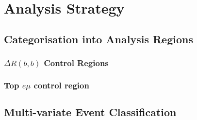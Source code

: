 \chapter{Analysis Strategy}%
\label{ch:strategy}
\section{Categorisation into Analysis Regions}
\label{sec:ana-regions}
\subsection{\texorpdfstring{$\Delta R(b,b)$}{DRbb} Control Regions}%
\label{sec:control-region-defintions}
\subsection{Top \texorpdfstring{$e \mu$}{e mu} control region}%
\label{sec:topemucr}
\section{Multi-variate Event Classification}%
\label{sec:mva}



